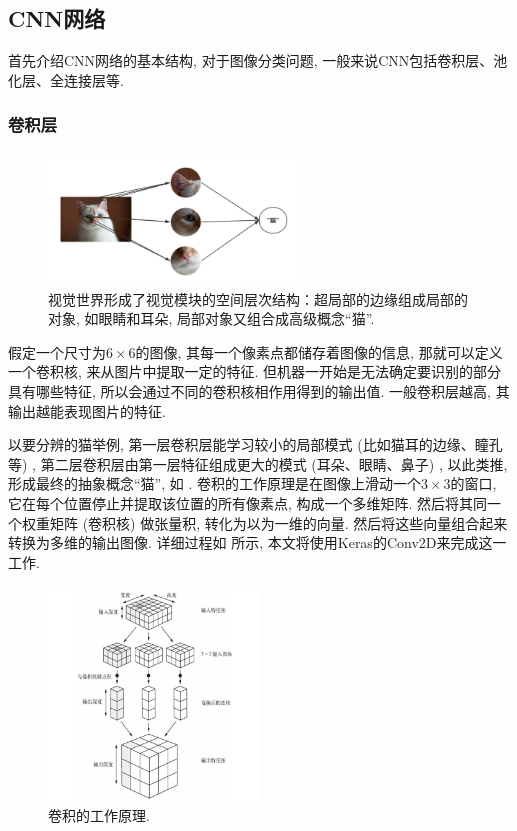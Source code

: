 \documentclass[lang=cn,11pt]{elegantpaper}
\begin{document}
\subsection{CNN网络}
首先介绍CNN网络的基本结构, 对于图像分类问题, 一般来说CNN包括卷积层、池化层、全连接层等. 
\subsubsection*{卷积层}
\tiny
\begin{figure}[htbp]
	\centering
  \includegraphics[width=0.6\textwidth]{cat1}
  \caption{视觉世界形成了视觉模块的空间层次结构：超局部的边缘组成局部的对象, 如眼睛和耳朵, 局部对象又组合成高级概念“猫”.\label{fig:cat1}}
\end{figure}

\normalsize
假定一个尺寸为$6\times 6$的图像, 其每一个像素点都储存着图像的信息, 那就可以定义一个卷积核, 来从图片中提取一定的特征. 但机器一开始是无法确定要识别的部分具有哪些特征, 所以会通过不同的卷积核相作用得到的输出值. 一般卷积层越高, 其输出越能表现图片的特征. 

以要分辨的猫举例, 第一层卷积层能学习较小的局部模式 (比如猫耳的边缘、瞳孔等) , 第二层卷积层由第一层特征组成更大的模式 (耳朵、眼睛、鼻子) , 以此类推, 形成最终的抽象概念“猫”, 如 . 
卷积的工作原理是在图像上滑动一个$3\times 3$的窗口, 它在每个位置停止并提取该位置的所有像素点, 构成一个多维矩阵. 然后将其同一个权重矩阵 (卷积核) 做张量积, 转化为以为一维的向量. 然后将这些向量组合起来转换为多维的输出图像. 详细过程如  所示, 本文将使用Keras的Conv2D来完成这一工作. 
\begin{figure}[htbp]
	\centering
  \includegraphics[width=0.5\textwidth]{conv1.png}
  \caption{卷积的工作原理.\label{fig:conv1}}
\end{figure}
\end{document}
